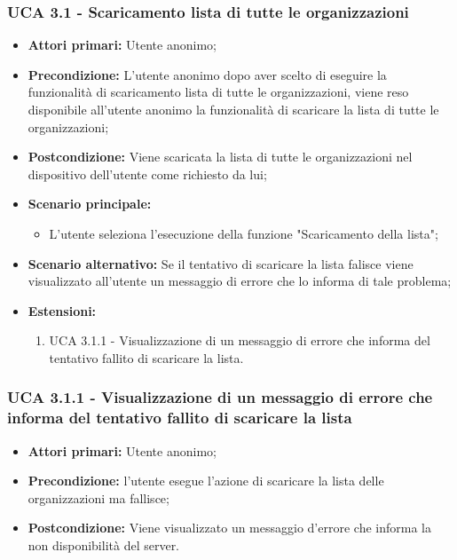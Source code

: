 \subsubsection{UCA 3.1 - Scaricamento lista di tutte le organizzazioni}%
\begin{itemize}
\item \textbf{Attori primari:} Utente anonimo;
\item \textbf{Precondizione:}  L'utente anonimo dopo aver scelto di eseguire la funzionalità di scaricamento lista di tutte le organizzazioni, viene reso disponibile all'utente anonimo la funzionalità di scaricare la lista di tutte le organizzazioni;
\item \textbf{Postcondizione:} Viene scaricata la lista di tutte le organizzazioni nel dispositivo dell'utente come richiesto da lui;
\item \textbf{Scenario principale:} 
\begin{itemize}
	\item L'utente seleziona l'esecuzione della funzione "Scaricamento della lista";
\end{itemize}
\item \textbf{Scenario alternativo:}  Se il tentativo di scaricare la lista falisce viene visualizzato all'utente un messaggio di errore che lo informa di tale problema;
\item \textbf{Estensioni:}
	\begin{enumerate}
	\item UCA 3.1.1 - Visualizzazione di un messaggio di errore che informa del tentativo fallito di scaricare la lista.
\end{enumerate}
  
\end{itemize}

\subsubsection{UCA 3.1.1 - Visualizzazione di un messaggio di errore che informa del tentativo fallito di scaricare la lista}%
\begin{itemize}
\item \textbf{Attori primari:} Utente anonimo;
\item \textbf{Precondizione:} l'utente esegue l'azione di scaricare la lista delle organizzazioni ma fallisce;
\item \textbf{Postcondizione:} Viene visualizzato un messaggio d'errore che informa la non disponibilità del server.

\end{itemize}



